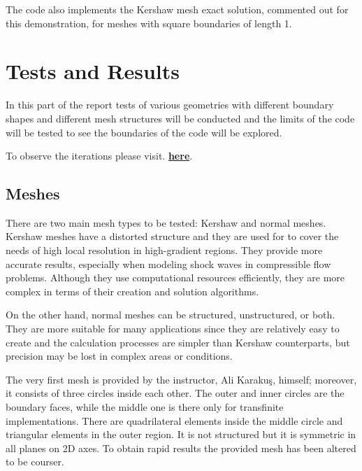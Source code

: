 \documentclass[a4paper, 12pt]{article}
\begin{document}
The code also implements the Kershaw mesh exact solution, commented out for this demonstration, for meshes with square boundaries of length 1. 

\section{Tests and Results}
In this part of the report tests of various geometries with different boundary shapes and different mesh structures will be conducted and the limits of the code will be tested to see the boundaries of the code will be explored.\\\par
To observe the iterations please visit. \href{https://www.baygeldi.com/485}{\textbf{here}}.
\subsection{Meshes}

There are two main mesh types to be tested: Kershaw and normal meshes. Kershaw meshes have a distorted structure and they are used for to cover the needs of high local resolution in high-gradient regions. They provide more accurate results, especially when modeling shock waves in compressible flow problems. Although they use computational resources efficiently, they are more complex in terms of their creation and solution algorithms.\\\par

On the other hand, normal meshes can be structured, unstructured, or both. They are more suitable for many applications since they are relatively easy to create and the calculation processes are simpler than Kershaw counterparts, but precision may be lost in complex areas or conditions.\\\par

The very first mesh is provided by the instructor, Ali Karakuş, himself; moreover, it consists of three circles inside each other. The outer and inner circles are the boundary faces, while the middle one is there only for transfinite implementations. There are quadrilateral elements inside the middle circle and triangular elements in the outer region. It is not structured but it is symmetric in all planes on 2D axes. To obtain rapid results the provided mesh has been altered to be courser. \\\par
\end{document}
